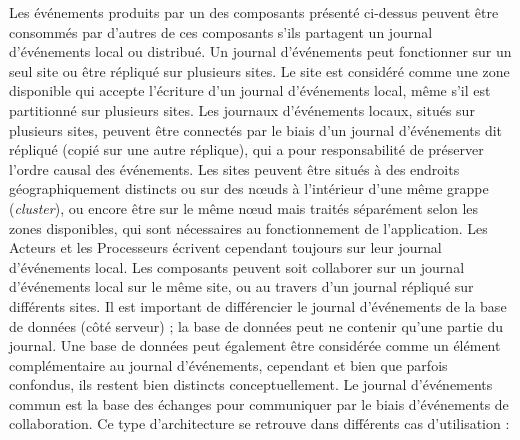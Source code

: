 Les événements produits par un des composants présenté ci-dessus
peuvent être consommés par d'autres de ces composants s'ils partagent un 
journal d'événements local ou distribué. Un journal d'événements peut 
fonctionner sur un seul site ou être répliqué 
sur plusieurs sites. 
Le site est considéré comme une zone disponible qui accepte 
l'écriture d'un journal d'événements local, même s'il est partitionné sur plusieurs 
sites. Les journaux d'événements locaux, situés sur plusieurs sites, peuvent être 
connectés par le biais d'un journal d'événements dit \og répliqué\fg{} (copié sur une 
autre réplique), qui a pour responsabilité de préserver l'ordre causal des 
événements.
Les sites peuvent être situés à des endroits géographiquement distincts ou sur 
des nœuds à l'intérieur d'une même grappe (\textit{cluster}), ou encore être sur le 
même nœud mais traités séparément selon les zones 
disponibles, qui sont nécessaires au fonctionnement de l'application. 
Les Acteurs et les Processeurs écrivent cependant toujours sur leur journal 
d'événements local. 
Les composants peuvent soit collaborer sur un journal d'événements local sur le 
même site, ou au travers d'un journal répliqué sur différents sites.
Il est important de différencier le journal d'événements de la base de données 
(côté serveur) ; la base de données peut ne contenir qu'une partie du journal. 
Une base de données peut également être considérée comme un élément 
complémentaire au journal d'événements, cependant et bien que parfois 
confondus, ils restent bien distincts conceptuellement.
Le journal d'événements commun est la base des échanges pour communiquer 
par le biais d'événements de collaboration. Ce type d'architecture se retrouve dans 
différents cas d'utilisation :
